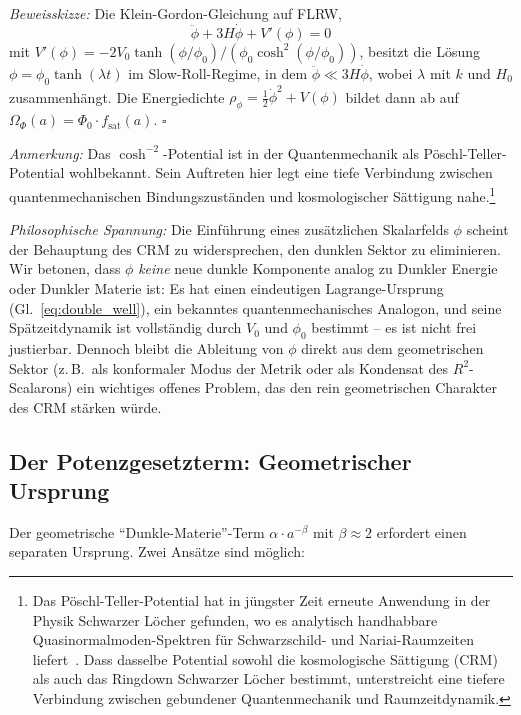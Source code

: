 \documentclass[11pt,a4paper]{article}
\begin{document}
\textit{Beweisskizze:} Die Klein-Gordon-Gleichung auf FLRW,
\begin{equation}
\ddot{\phi} + 3H\dot{\phi} + V'(\phi) = 0
\end{equation}
mit $V'(\phi) = -2V_0 \tanh(\phi/\phi_0)/(\phi_0 \cosh^2(\phi/\phi_0))$, besitzt die L\"osung $\phi = \phi_0 \tanh(\lambda t)$ im Slow-Roll-Regime, in dem $\ddot{\phi} \ll 3H\dot{\phi}$, wobei $\lambda$ mit $k$ und $H_0$ zusammenh\"angt. Die Energiedichte $\rho_\phi = \frac{1}{2}\dot{\phi}^2 + V(\phi)$ bildet dann ab auf $\Omega_\Phi(a) = \Phi_0 \cdot f_{\mathrm{sat}}(a)$. \hfill $\square$

\textit{Anmerkung:} Das $\cosh^{-2}$-Potential ist in der Quantenmechanik als P\"oschl-Teller-Potential wohlbekannt. Sein Auftreten hier legt eine tiefe Verbindung zwischen quantenmechanischen Bindungszust\"anden und kosmologischer S\"attigung nahe.\footnote{Das P\"oschl-Teller-Potential hat in j\"ungster Zeit erneute Anwendung in der Physik Schwarzer L\"ocher gefunden, wo es analytisch handhabbare Quasinormalmoden-Spektren f\"ur Schwarzschild- und Nariai-Raumzeiten liefert~\cite{ZhongPT2022, NariaiQNM2025}. Dass dasselbe Potential sowohl die kosmologische S\"attigung (CRM) als auch das Ringdown Schwarzer L\"ocher bestimmt, unterstreicht eine tiefere Verbindung zwischen gebundener Quantenmechanik und Raumzeitdynamik.}

\textit{Philosophische Spannung:} Die Einf\"uhrung eines zus\"atzlichen Skalarfelds $\phi$ scheint der Behauptung des CRM zu widersprechen, den dunklen Sektor zu eliminieren. Wir betonen, dass $\phi$ \textit{keine} neue dunkle Komponente analog zu Dunkler Energie oder Dunkler Materie ist: Es hat einen eindeutigen Lagrange-Ursprung (Gl.~\ref{eq:double_well}), ein bekanntes quantenmechanisches Analogon, und seine Sp\"atzeitdynamik ist vollst\"andig durch $V_0$ und $\phi_0$ bestimmt -- es ist nicht frei justierbar. Dennoch bleibt die Ableitung von $\phi$ direkt aus dem geometrischen Sektor (z.\,B.\ als konformaler Modus der Metrik oder als Kondensat des $R^2$-Scalarons) ein wichtiges offenes Problem, das den rein geometrischen Charakter des CRM st\"arken w\"urde.

\subsection{Der Potenzgesetzterm: Geometrischer Ursprung}

Der geometrische "`Dunkle-Materie"'-Term $\alpha \cdot a^{-\beta}$ mit $\beta \approx 2$ erfordert einen separaten Ursprung. Zwei Ans\"atze sind m\"oglich:
\end{document}
